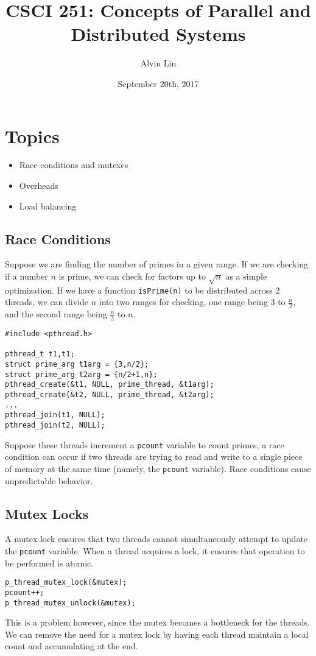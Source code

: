 \documentclass{math}
\title{CSCI 251: Concepts of Parallel and Distributed Systems}
\author{Alvin Lin}
\date{September 20th, 2017}
\begin{document}
\maketitle

\section*{Topics}
\begin{itemize}
  \item Race conditions and mutexes
  \item Overheads
  \item Load balancing
\end{itemize}

\subsection*{Race Conditions}
Suppose we are finding the number of primes in a given range. If we are
checking if a number \( n \) is prime, we can check for factors up to
\( \sqrt{n} \) as a simple optimization. If we have a function
\texttt{isPrime(n)} to be distributed across 2 threads, we can divide \( n \)
into two ranges for checking, one range being 3 to \( \frac{n}{2} \), and the
second range being \( \frac{n}{2} \) to \( n \).
\begin{lstlisting}
#include <pthread.h>

pthread_t t1,t1;
struct prime_arg t1arg = {3,n/2};
struct prime_arg t2arg = {n/2+1,n};
pthread_create(&t1, NULL, prime_thread, &t1arg);
pthread_create(&t2, NULL, prime_thread, &t2arg);
...
pthread_join(t1, NULL);
pthread_join(t2, NULL);
\end{lstlisting}
Suppose these threads increment a \texttt{pcount} variable to count primes,
a race condition can occur if two threads are trying to read and write to a
single piece of memory at the same time (namely, the \texttt{pcount} variable).
Race conditions cause unpredictable behavior.

\subsection*{Mutex Locks}
A mutex lock ensures that two threads cannot simultaneously attempt to update
the \texttt{pcount} variable. When a thread acquires a lock, it ensures that
operation to be performed is atomic.
\begin{lstlisting}
p_thread_mutex_lock(&mutex);
pcount++;
p_thread_mutex_unlock(&mutex);
\end{lstlisting}
This is a problem however, since the mutex becomes a bottleneck for the threads.
We can remove the need for a mutex lock by having each thread maintain a local
count and accumulating at the end.
\end{document}
